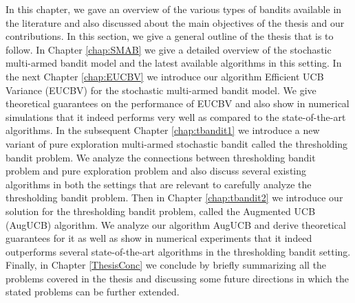 In this chapter, we gave an overview of the various types of bandits available in the literature and also discussed about the main objectives of the thesis and our contributions. In this section, we give a general outline of the thesis that is to follow. In Chapter \ref{chap:SMAB} we give a detailed overview of the stochastic multi-armed bandit model and the latest available algorithms in this setting. In the next Chapter \ref{chap:EUCBV} we introduce our algorithm Efficient UCB Variance (EUCBV) for the stochastic multi-armed bandit model. We give theoretical guarantees on the performance of EUCBV and also show in numerical simulations that it indeed performs very well as compared to the state-of-the-art algorithms. In the subsequent Chapter \ref{chap:tbandit1} we introduce a new variant of pure exploration multi-armed stochastic bandit called the thresholding bandit problem. We analyze the connections between thresholding bandit problem and pure exploration problem and also discuss several existing algorithms in both the settings that are relevant to carefully analyze the thresholding bandit problem. Then in Chapter \ref{chap:tbandit2} we introduce our solution for the thresholding bandit problem, called the Augmented UCB (AugUCB) algorithm. We analyze our algorithm AugUCB and derive theoretical guarantees for it as well as show in numerical experiments that it indeed outperforms several state-of-the-art algorithms in the thresholding bandit setting. Finally, in Chapter \ref{ThesisConc} we conclude by briefly summarizing all the problems covered in the thesis and discussing some future directions in which the stated problems can be further extended.


